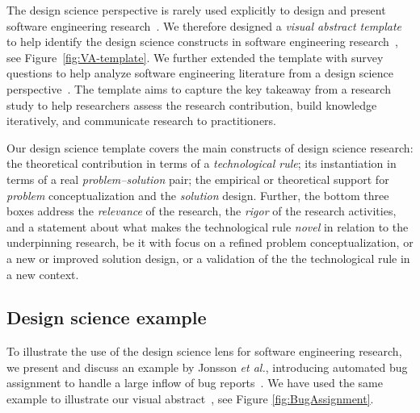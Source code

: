 \documentclass[graybox]{svmult}
\begin{document}
The design science perspective is rarely used explicitly to design and present software engineering research~\cite{Engstrom19arxiv}. We therefore designed a \emph{visual abstract template} to help identify the design science constructs in software engineering research~\cite{StoreyESEM17}, see Figure~\ref{fig:VA-template}. We further extended the template with survey questions to help analyze software engineering literature from a design science perspective~\cite{Engstrom19arxiv}. The template aims to capture the key takeaway from a research study to help researchers assess the research contribution, build knowledge iteratively, and communicate research to practitioners. %

Our design science template covers the main constructs of design science research: the theoretical contribution in terms of a \emph{technological rule}; its instantiation in terms of a real \emph{problem--solution} pair; the empirical or theoretical support for \emph{problem} conceptualization and the \emph{solution} design. Further, the bottom three boxes address the \emph{relevance} of the research, the \emph{rigor} of the research activities, and a statement about what makes the technological rule \emph{novel} in relation to the underpinning research, be it with focus on a refined problem conceptualization, or a new or improved solution design, or a validation of the the technological rule in a new context. 



\subsection{Design science example}
\label{sec:examples}
To illustrate the use of the design science lens for software engineering research, we present and discuss an example by Jonsson \emph{et al.}, introducing automated bug assignment to handle a large inflow of bug reports~\cite{JonssonBug15}. We have used the same example to illustrate our visual abstract~\cite{StoreyESEM17}, see Figure \ref{fig:BugAssignment}.
\end{document}
